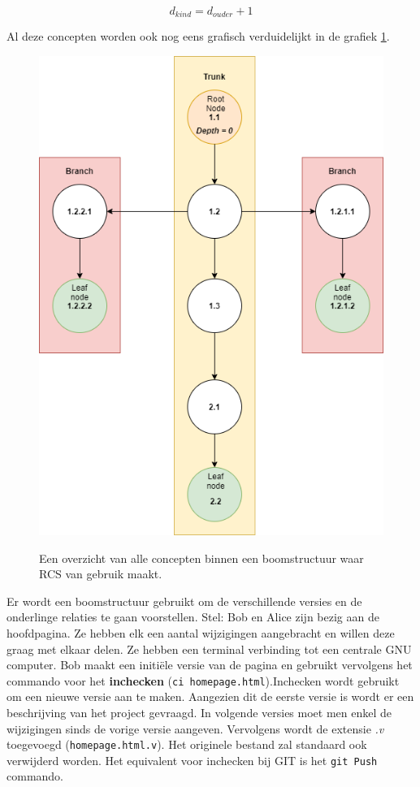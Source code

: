 \begin{equation}
	d_{kind} = d_{ouder} + 1
\end{equation}

Al deze concepten worden ook nog eens grafisch verduidelijkt in de grafiek \ref{fig:tree}.

\begin{figure}[h!]
\centering
\includegraphics[scale=0.5]{tree1.png}
\label{fig:tree}
\caption[Overzicht concepten boomstructuur]{Een overzicht van alle concepten binnen een boomstructuur waar RCS van gebruik maakt.}
\end{figure}

Er wordt een boomstructuur gebruikt om de verschillende versies en de onderlinge relaties te gaan voorstellen. Stel: Bob en Alice zijn bezig aan de hoofdpagina. Ze hebben elk een aantal wijzigingen aangebracht en willen deze graag met elkaar delen. Ze hebben een terminal verbinding tot een centrale GNU computer. Bob maakt een initiële versie van de pagina en gebruikt vervolgens het commando voor het \textbf{inchecken} (\Verb+ci homepage.html+).Inchecken wordt gebruikt om een nieuwe versie aan te maken. Aangezien dit de eerste versie is wordt er een beschrijving van het project gevraagd. In volgende versies moet men enkel de wijzigingen sinds de vorige versie aangeven. Vervolgens wordt de extensie \textit{.v} toegevoegd (\verb+homepage.html.v+). Het originele bestand zal standaard ook verwijderd worden. Het equivalent voor inchecken bij GIT is het \verb+git Push+ commando.\\


